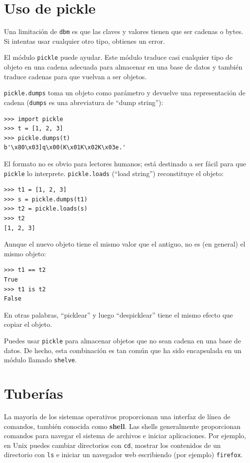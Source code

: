 \documentclass[10pt]{book}
\begin{document}
\section{Uso de pickle}

Una limitación de {\tt dbm} es que las claves y valores tienen que ser
cadenas o bytes.  Si intentas usar cualquier otro tipo, obtienes un error.
 

El módulo {\tt pickle} puede ayudar.  Este módulo traduce
casi cualquier tipo de objeto en una cadena adecuada para almacenar
en una base de datos y también traduce cadenas para que vuelvan a ser objetos.

{\tt pickle.dumps} toma un objeto como parámetro y devuelve
una representación de cadena ({\tt dumps} es una abreviatura de ``dump string''):

\begin{verbatim}
>>> import pickle
>>> t = [1, 2, 3]
>>> pickle.dumps(t)
b'\x80\x03]q\x00(K\x01K\x02K\x03e.'
\end{verbatim}
%
El formato no es obvio para lectores humanos; está destinado a ser
fácil para que {\tt pickle} lo interprete.  {\tt pickle.loads}
(``load string'') reconstituye el objeto:

\begin{verbatim}
>>> t1 = [1, 2, 3]
>>> s = pickle.dumps(t1)
>>> t2 = pickle.loads(s)
>>> t2
[1, 2, 3]
\end{verbatim}
%
Aunque el nuevo objeto tiene el mismo valor que el antiguo, no es
(en general) el mismo objeto:

\begin{verbatim}
>>> t1 == t2
True
>>> t1 is t2
False
\end{verbatim}
%
En otras palabras, ``picklear'' y luego ``despicklear'' tiene el mismo efecto
que copiar el objeto.

Puedes usar {\tt pickle} para almacenar objetos que no sean cadena en una base de datos.
De hecho, esta combinación es tan común que ha sido
encapsulada en un módulo llamado {\tt shelve}.


\section{Tuberías}

La mayoría de los sistemas operativos proporcionan una interfaz de línea de comandos,
también conocida como {\bf shell}.  Las shells generalmente proporcionan comandos
para navegar el sistema de archivos e iniciar aplicaciones.  Por
ejemplo, en Unix puedes cambiar directorios con {\tt cd},
mostrar los contenidos de un directorio con {\tt ls} e iniciar
un navegador web escribiendo (por ejemplo) {\tt firefox}.
\end{document}
